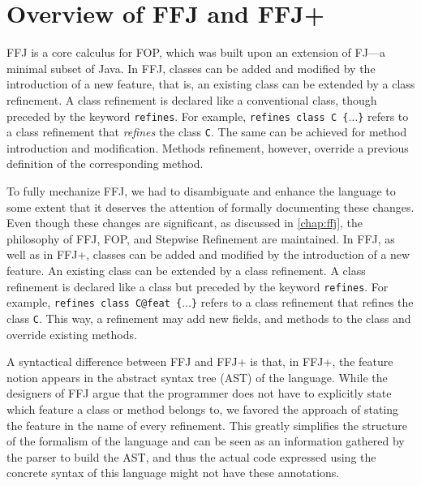 \chapter{Overview of \gls{FFJ} and \gls{FFJ+}}\label{chap:offj}

\gls{FFJ} is a core calculus for \gls{FOP}, which was built 
upon an extension of \gls{FJ}---a minimal subset of Java. 
In \gls{FFJ}, classes can be added and modified by the 
introduction of a new feature, that is, 
an existing class can be extended by a class refinement. 
A class refinement is declared like a conventional class, though 
preceded by the keyword \texttt{refines}. For example, 
\texttt{refines class C \{$\dots$\}} refers to a class
refinement that
\emph{refines} the class \texttt{C}. The same can be achieved 
for method introduction and modification. Methods refinement,
however, override a previous definition of the corresponding 
method.
 
To fully mechanize \gls{FFJ}, we had to disambiguate and enhance 
the language to some extent that it  deserves the attention of 
formally documenting these changes. 
Even though these changes are significant, as discussed in \cref{chap:ffj}, 
the philosophy of \gls{FFJ}, \gls{FOP}, and Stepwise Refinement are maintained.
In \gls{FFJ}, as well as in \gls{FFJ+}, classes can be added and 
modified by the introduction of a new feature.
An existing class can be extended by a class refinement. A class refinement is declared like a class but
preceded by the keyword \texttt{refines}. For example, \texttt{refines class C@feat \{$\dots$\}} refers to a class refinement that
refines the class \texttt{C}. This way, a refinement may add new fields, and methods to the class
and override existing methods.  

A syntactical difference between \gls{FFJ} and \gls{FFJ+} is that, in \gls{FFJ+}, 
the feature notion appears in the abstract syntax tree (AST) of the language.
While the designers of \gls{FFJ} argue that the programmer does not have 
to explicitly state which feature a class or method belongs to, 
we favored the approach of stating the feature in the name of every refinement.
This greatly simplifies the structure of the formalism of the language and can be 
seen as an information gathered by the parser to build the AST, and thus 
the actual code expressed using the concrete syntax of this language 
might not have these annotations.

